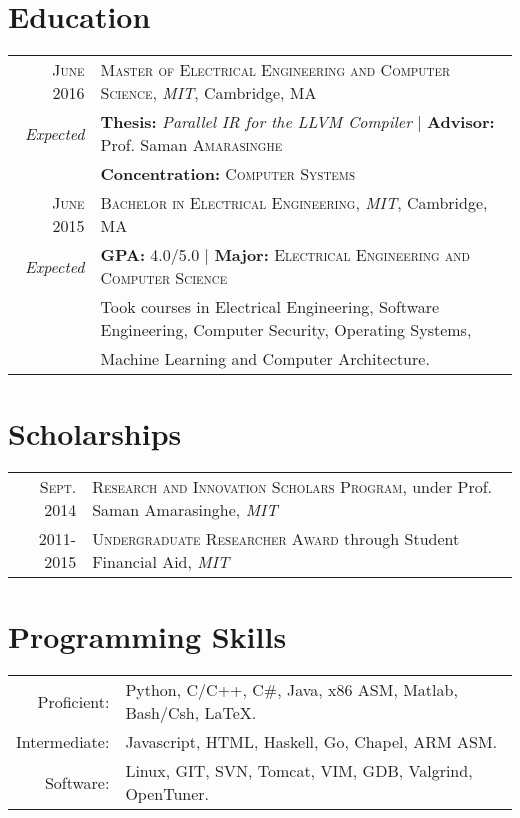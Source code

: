 \documentclass[lettersize,10pt]{article}
\begin{document}
\section{Education}
\begin{tabular}{rl}	
\textsc{June} 2016& \textsc{Master of Electrical Engineering and Computer Science}, \emph{MIT}, Cambridge, MA\\\
\emph{Expected}& \textbf{Thesis:} \emph{Parallel IR for the LLVM Compiler} | \textbf{Advisor:} Prof. Saman \textsc{Amarasinghe}\\
& \textbf{Concentration:} \textsc{Computer Systems}\\

\textsc{June} 2015 & \textsc{Bachelor in Electrical Engineering}, \emph{MIT}, Cambridge, MA\\
\emph{Expected} & \textbf{GPA:} 4.0/5.0 | \textbf{Major:} \textsc{Electrical Engineering and Computer Science}\\
& Took courses in Electrical Engineering, Software Engineering, Computer Security, Operating Systems, \\
& Machine Learning and Computer Architecture.\\
\end{tabular}

\section{Scholarships}
\begin{tabular}{rl}
 \textsc{Sept.} 2014 & \textsc{Research and Innovation Scholars Program}, under Prof. Saman Amarasinghe, \emph{MIT}\\
 2011-2015 & \textsc{Undergraduate Researcher Award} through Student Financial Aid, \emph{MIT}\\
\end{tabular}

\section{Programming Skills}
\begin{tabular}{rl}
Proficient:& Python, C/C++, C\#, Java, x86 ASM, Matlab, Bash/Csh, \LaTeX.\\
Intermediate:& Javascript, HTML, Haskell, Go, Chapel, ARM ASM.\\
Software:& Linux, GIT, SVN, Tomcat, VIM, GDB, Valgrind, OpenTuner.\\
\end{tabular}
\end{document}
